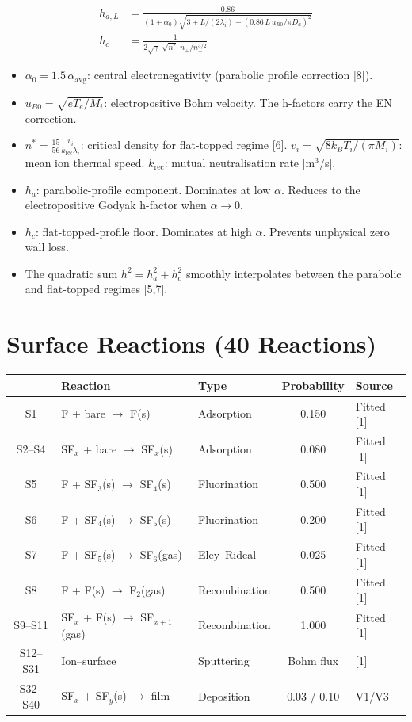 \documentclass[11pt,a4paper]{article}
\begin{document}
\begin{align}
h_{a,L} &= \frac{0.86}{(1+\alpha_0)\sqrt{3 + L/(2\lambda_i) + (0.86\,L\,u_{B0}/\pi D_a)^2}} \label{eq:ha}\\
h_c &= \frac{1}{2\sqrt{\gamma}\;\sqrt{n^*}\;n_+/n_-^{3/2}} \label{eq:hc}
\end{align}

\begin{itemize}[nosep]
\item $\alpha_0 = 1.5\,\alpha_\text{avg}$: central electronegativity (parabolic profile correction [8]).
\item $u_{B0} = \sqrt{eT_e/M_i}$: electropositive Bohm velocity. The h-factors carry the EN correction.
\item $n^* = \frac{15}{56}\frac{v_i}{k_\text{rec}\lambda_i}$: critical density for flat-topped regime [6]. $v_i = \sqrt{8k_BT_i/(\pi M_i)}$: mean ion thermal speed. $k_\text{rec}$: mutual neutralisation rate [m$^3$/s].
\item $h_a$: parabolic-profile component. Dominates at low $\alpha$. Reduces to the electropositive Godyak h-factor when $\alpha \to 0$.
\item $h_c$: flat-topped-profile floor. Dominates at high $\alpha$. Prevents unphysical zero wall loss.
\item The quadratic sum $h^2 = h_a^2 + h_c^2$ smoothly interpolates between the parabolic and flat-topped regimes [5,7].
\end{itemize}

\section{Surface Reactions (40 Reactions)}

\begin{table}[H]
\centering\small
\begin{tabular}{cllcl}
\toprule
& \textbf{Reaction} & \textbf{Type} & \textbf{Probability} & \textbf{Source} \\
\midrule
S1 & F + bare $\to$ F(s) & Adsorption & 0.150 & Fitted [1] \\
S2--S4 & SF$_x$ + bare $\to$ SF$_x$(s) & Adsorption & 0.080 & Fitted [1] \\
S5 & F + SF$_3$(s) $\to$ SF$_4$(s) & Fluorination & 0.500 & Fitted [1] \\
S6 & F + SF$_4$(s) $\to$ SF$_5$(s) & Fluorination & 0.200 & Fitted [1] \\
S7 & F + SF$_5$(s) $\to$ SF$_6$(gas) & Eley--Rideal & 0.025 & Fitted [1] \\
S8 & F + F(s) $\to$ F$_2$(gas) & Recombination & 0.500 & Fitted [1] \\
S9--S11 & SF$_x$ + F(s) $\to$ SF$_{x+1}$(gas) & Recombination & 1.000 & Fitted [1] \\
S12--S31 & Ion--surface & Sputtering & Bohm flux & [1] \\
S32--S40 & SF$_x$ + SF$_y$(s) $\to$ film & Deposition & 0.03 / 0.10 & V1/V3 \\
\bottomrule
\end{tabular}
\end{table}
\end{document}
